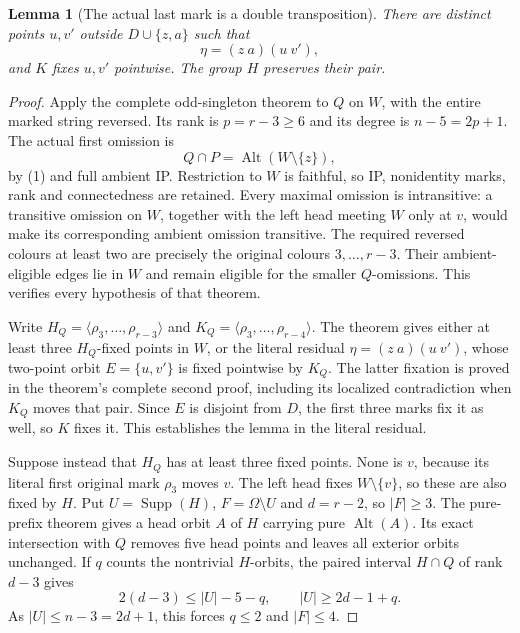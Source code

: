 \documentclass[11pt,a4paper]{article}
\newtheorem{lemma}{Lemma}
\newcommand{\gen}[1]{\langle#1\rangle}
\newcommand{\Alt}{\operatorname{Alt}}
\begin{document}
\begin{lemma}[The actual last mark is a double transposition]
There are distinct points $u,v'$ outside $D\cup\{z,a\}$ such that
\[
                       \eta=(z\ a)(u\ v'),
\]
and $K$ fixes $u,v'$ pointwise. The group $H$ preserves their pair.
\end{lemma}
\begin{proof}
Apply the complete odd-singleton theorem to $Q$ on $W$, with
the entire marked string reversed. Its rank is $p=r-3\ge6$
and its degree is $n-5=2p+1$. The actual first omission is
\[
               Q\cap P=\Alt(W\setminus\{z\}),
\]
by (1) and full ambient IP. Restriction to $W$ is faithful,
so IP, nonidentity marks, rank and connectedness are retained.
Every maximal omission is intransitive: a transitive omission
on $W$, together with the left head meeting $W$ only at $v$,
would make its corresponding ambient omission transitive.
The required reversed colours at least two are precisely the
original colours $3,\ldots,r-3$. Their ambient-eligible edges
lie in $W$ and remain eligible for the smaller $Q$-omissions.
This verifies every hypothesis of that theorem.

Write $H_Q=\gen{\rho_3,\ldots,\rho_{r-3}}$ and
$K_Q=\gen{\rho_3,\ldots,\rho_{r-4}}$.
The theorem gives either at least three $H_Q$-fixed points
in $W$, or the literal residual
$\eta=(z\ a)(u\ v')$, whose two-point orbit
$E=\{u,v'\}$ is fixed pointwise by $K_Q$.
The latter fixation is proved in the theorem's complete
second proof, including its localized contradiction when
$K_Q$ moves that pair. Since $E$ is disjoint from $D$,
the first three marks fix it as well, so $K$ fixes it.
This establishes the lemma in the literal residual.

Suppose instead that $H_Q$ has at least three fixed points.
None is $v$, because its literal first original mark
$\rho_3$ moves $v$. The left head fixes $W\setminus\{v\}$,
so these are also fixed by $H$. Put $U=\operatorname{Supp}(H)$,
$F=\Omega\setminus U$ and $d=r-2$, so $|F|\ge3$.
The pure-prefix theorem gives a head orbit $A$ of $H$
carrying pure $\Alt(A)$. Its exact intersection with $Q$
removes five head points and leaves all exterior orbits unchanged.
If $q$ counts the nontrivial $H$-orbits, the paired interval
$H\cap Q$ of rank $d-3$ gives
\[
          2(d-3)\le |U|-5-q,\qquad |U|\ge2d-1+q.
                                                               \tag{2}
\]
As $|U|\le n-3=2d+1$, this forces $q\le2$ and $|F|\le4$.


\end{proof}
\end{document}
